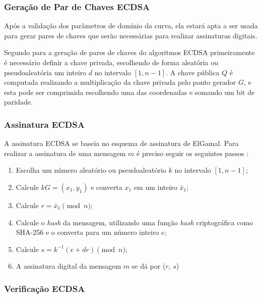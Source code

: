 \subsubsection{Geração de Par de Chaves ECDSA}

Após a validação dos parâmetros de domínio da curva, ela estará apta a ser usada para gerar pares de chaves que serão necessárias para realizar assinaturas digitais.

Segundo  para a geração de pares de chaves do algoritmos ECDSA primeiramente é necessário definir a chave privada, escolhendo de forma aleatória ou pseudoaleatória um inteiro $d$ no intervalo $[1, n - 1]$. A chave pública $Q$ é computada realizando a multiplicação da chave privada pelo ponto gerador $G$, e esta pode ser comprimida escolhendo uma das coordenadas e somando um bit de paridade.

\subsubsection{Assinatura ECDSA}
 
A assinatura ECDSA se baseia no esquema de assinatura de ElGamal. Para realizar a assinatura de uma mensagem $m$ é preciso seguir os seguintes passos \cite{johnson2001elliptic}:
\begin{enumerate}
    \item Escolha um número aleatório ou pseudoaleatório $k$ no intervalo $[1, n - 1]$;
    \item Calcule $kG = (x_1,y_1)$ e converta $x_1$ em um inteiro $\bar x_1$;
    \item Calcule $r = \bar x_1 \pmod{n}$;
    \item Calcule o \textit{hash} da mensagem, utilizando uma função \textit{hash} criptográfica como SHA-256 e o converta para um número inteiro $e$;
    \item Calcule $s = k^{-1} (e + dr) \pmod{n}$;
    \item A assinatura digital da mensagem $m$ se dá por ($r$, $s$)
\end{enumerate}

\subsubsection{Verificação ECDSA}

